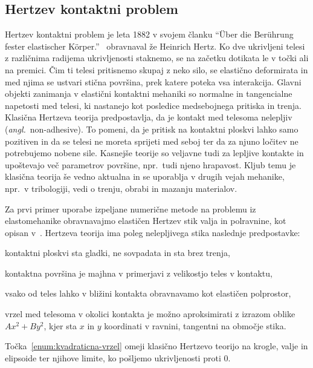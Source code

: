 \documentclass[12pt,a4paper,twoside]{article}
\theoremstyle{definition} %
\theoremstyle{plain} %
\numberwithin{equation}{section}
\newenvironment{enumerate*}{\vspace{-1.5\parskip}\begin{enumerate}\setlength{\itemsep}{0pt}\setlength{\parskip}{2pt}}{\end{enumerate}\vspace{-1\parskip}}
\newcommand{\ang}[1]{(\textit{angl.}\ #1)}
\begin{document}
\subsection{Hertzev kontaktni problem}
Hertzev kontaktni problem je leta 1882 v svojem članku ``{\"U}ber die Ber{\"u}hrung fester
elastischer K{\"o}rper.''~\cite{hertz1882beruhrung} obravnaval že Heinrich Hertz. Ko dve ukrivljeni
telesi z različnima radijema ukrivljenosti staknemo, se na začetku dotikata le v točki ali na
premici. Čim ti telesi pritisnemo skupaj z neko silo, se elastično deformirata in
med njima se ustvari stična površina, prek katere poteka vsa interakcija. Glavni objekti
zanimanja v elastični kontaktni mehaniki so normalne in tangencialne napetosti med telesi, ki nastanejo kot
posledice medsebojnega pritiska in trenja. Klasična Hertzeva teorija predpostavlja, da je kontakt
med telesoma nelepljiv \ang{non-adhesive}. To pomeni, da je pritisk na kontaktni ploskvi lahko samo
pozitiven in da se telesi ne moreta sprijeti med seboj ter da za njuno ločitev ne potrebujemo nobene
sile. Kasnejše teorije so veljavne tudi za lepljive kontakte in upoštevajo več parametrov površine,
npr.\ tudi njeno hrapavost. Kljub temu je klasična teorija še vedno aktualna in se uporablja v
drugih vejah mehanike, npr.\ v tribologiji, vedi o trenju, obrabi in mazanju materialov.

Za prvi primer uporabe izpeljane numerične metode na problemu iz elastomehanike obravnavajmo
elastičen Hertzev stik valja in polravnine, kot opisan v~\cite[str.\ 122, poglavje 3.2]{williams2001contact}.
Hertzeva teorija ima poleg nelepljivega stika naslednje predpostavke:
\begin{enumerate*}
  \item kontaktni ploskvi sta gladki, ne sovpadata in sta brez trenja,
  \item kontaktna površina je majhna v primerjavi z velikostjo teles v kontaktu,
  \item vsako od teles lahko v bližini kontakta obravnavamo kot elastičen polprostor,
  \item vrzel med telesoma v okolici kontakta je možno aproksimirati z izrazom oblike $Ax^2 + By^2$,
    kjer sta $x$ in $y$ koordinati v ravnini, tangentni na območje stika.
    \label{enum:kvadraticna-vrzel}
\end{enumerate*}
Točka~\ref{enum:kvadraticna-vrzel} omeji klasično Hertzevo teorijo na krogle, valje in elipsoide ter
njihove limite, ko pošljemo ukrivljenosti proti 0.
\end{document}

